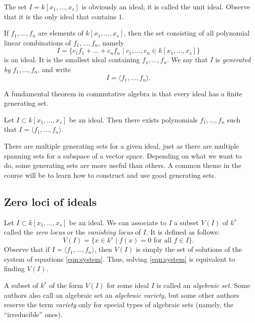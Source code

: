\documentclass[11pt]{article}
\begin{document}
\begin{example}
  The set $I = k[x_1,\dots,x_s]$ is obviously an ideal; it is called the unit ideal.
  Observe that it is the only ideal that contains $1$.
\end{example}

\begin{example}
  If $f_1, \dots, f_n$ are elements of $k[x_1, \dots, x_s]$, then the set consisting of all polynomial linear combinations of $f_1, \dots, f_n$, namely
  \[ I = \{c_1f_1 + \dots + c_nf_n \mid c_1, \dots, c_n \in k[x_1,\dots,x_s]\}\]
  is an ideal.
  It is the smallest ideal containing $f_1, \dots, f_n$.
  We say that $I$ is \emph{generated by} $f_1, \dots, f_n$, and write
  \[ I = \langle  f_1, \dots, f_n \rangle.\]
\end{example}

A fundamental theorem in commutative algebra is that every ideal has a finite generating set.
\begin{theorem}
  Let $I \subset k[x_1, \dots, x_s]$ be an ideal.
  Then there exists polynomials $f_1, \dots, f_n$ such that $I = \langle  f_1, \dots, f_n \rangle$.
\end{theorem}
There are multiple generating sets for a given ideal, just as there are multiple spanning sets for a subspace of a vector space.
Depending on what we want to do, some generating sets are more useful than others.
A common theme in the course will be to learn how to construct and use good generating sets.

\subsection{Zero loci of ideals}
Let $I \subset k[x_1, \dots, x_s]$ be an ideal.
We can associate to $I$ a subset $V(I)$ of $k^s$ called the \emph{zero locus} or the \emph{vanishing locus} of $I$.
It is defined as follows:
\[
  V(I) = \{x \in k^s \mid f(x) = 0 \text{ for all $f \in I$}\}.
\]
Observe that if $I = \langle  f_1, \dots, f_n \rangle$, then $V(I)$ is simply the set of solutions of the system of equations \eqref{eqn:system}.
Thus, solving \eqref{eqn:system} is equivalent to finding $V(I)$.

A subset of $k^s$ of the form $V(I)$ for some ideal $I$ is called an \emph{algebraic set}.
Some authors also call an algebraic set an \emph{algebraic variety}, but some other authors reserve the term \emph{variety} only for special types of algebraic sets (namely, the ``irreducible'' ones).
\end{document}
